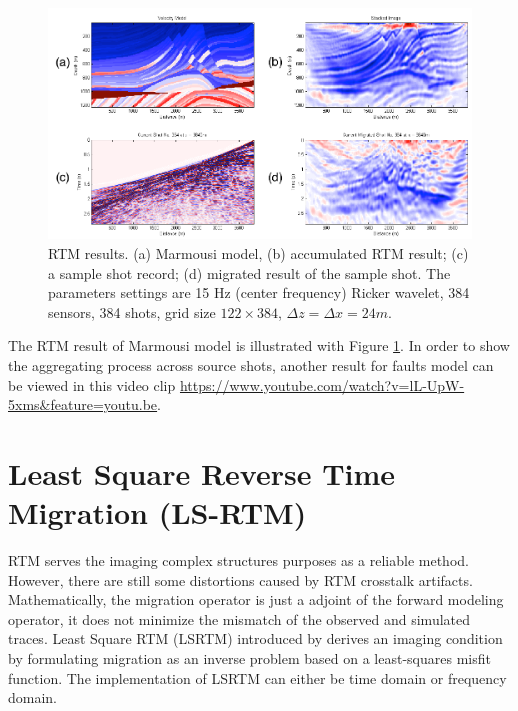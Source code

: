 \documentclass[11pt]{article}
\theoremstyle{plain}
\theoremstyle{definition}
\theoremstyle{remark}
\numberwithin{equation}{section}
\begin{document}
\begin{figure}
\centering
\includegraphics[width=1\textwidth]{Fig/MarmousiRTM.pdf}
\caption{RTM results. (a) Marmousi model, (b) accumulated RTM result; (c) a sample shot record; (d) migrated result of the sample shot. The parameters settings are 15 Hz (center frequency) Ricker wavelet, 384 sensors, 384 shots, grid size $122 \times 384$, $\Delta z = \Delta x = 24m$.}
\label{fig:RTM}
\end{figure}

The RTM result of Marmousi model is illustrated with Figure \ref{fig:RTM}. In order to show the aggregating process across source shots, another result for faults model can be viewed in this video clip
\url{https://www.youtube.com/watch?v=lL-UpW-5xms&feature=youtu.be}.



\section{Least Square Reverse Time Migration (LS-RTM)}
RTM serves the imaging complex structures purposes as a reliable method. However, there are still some distortions caused by RTM crosstalk
artifacts. Mathematically, the migration operator is just a adjoint of the forward modeling operator, it does not minimize the mismatch of the observed and simulated traces. Least Square RTM (LSRTM) introduced by \cite{NemWuAO1999} derives an imaging condition by formulating migration as an inverse problem based on a least-squares misfit function. The implementation of LSRTM can either be time domain or frequency domain.
\end{document}
